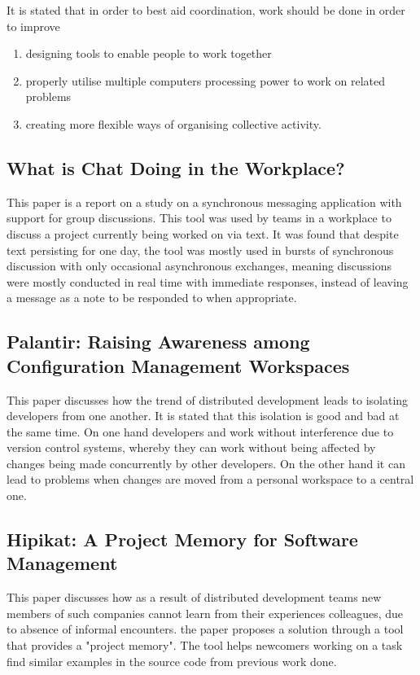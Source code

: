 \documentclass{l4proj}
\begin{document}
It is stated that in order to best aid coordination, work should be done in order to improve
\begin{enumerate}
\item designing tools to enable people to work together
\item properly utilise multiple computers processing power to work on related problems
\item creating more flexible ways of organising collective activity.
\end{enumerate}

\subsection {What is Chat Doing in the Workplace?}

This paper is a report on a study on a synchronous messaging application with support for group discussions.  This tool was used by teams in a workplace to discuss a project currently being worked on via text. It was found that despite text persisting for one day, the tool was mostly used in bursts of synchronous discussion with only occasional asynchronous exchanges, meaning discussions were mostly conducted in real time with immediate responses, instead of leaving a message as a note to be responded to when appropriate. 

\subsection {Palantir: Raising Awareness among Configuration Management Workspaces}

This paper discusses how the trend of distributed development leads to isolating developers from one another.  It is stated that this isolation is good and bad at the same time.  On one hand developers and work without interference due to version control systems, whereby they can work without being affected by changes being made concurrently by other developers.  On the other hand it can lead to problems when changes are moved from a personal workspace to a central one.  

\subsection {Hipikat: A Project Memory for Software Management}

This paper discusses how as a result of distributed development teams new members of such companies cannot learn from their experiences colleagues, due to absence of informal encounters.
 the paper proposes a solution through a tool that provides a "project memory".  The tool helps newcomers working on a task find similar examples in the source code from previous work done. 
\end{document}
